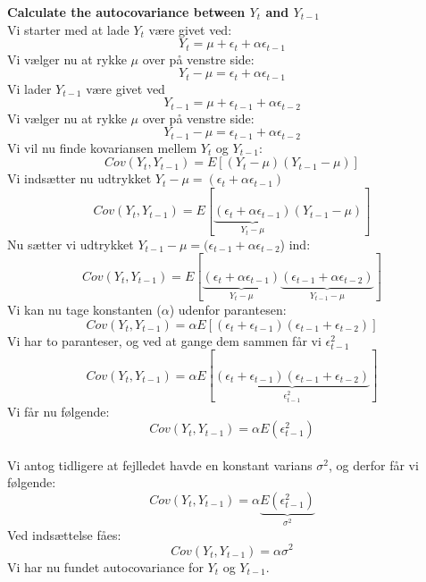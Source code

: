 \documentclass[
  10pt,
]{article}
\begin{document}
\textbf{Calculate the autocovariance between $Y_t$ and $Y_{t-1}$}\\
Vi starter med at lade \(Y_t\) være givet ved:\\
\[Y_t = \mu + \epsilon_t + \alpha \epsilon_{t-1} \] Vi vælger nu at
rykke \(\mu\) over på venstre side:\\
\[Y_t - \mu = \epsilon_t + \alpha \epsilon_{t-1} \] Vi lader \(Y_{t-1}\)
være givet ved\\
\[Y_{t-1} = \mu + \epsilon_{t-1} + \alpha \epsilon_{t-2} \] Vi vælger nu
at rykke \(\mu\) over på venstre side:\\
\[Y_{t-1} - \mu = \epsilon_{t-1} + \alpha \epsilon_{t-2} \] Vi vil nu
finde kovariansen mellem \(Y_t\) og \(Y_{t-1}\):\\
\[Cov(Y_t,Y_{t-1}) = E[(Y_t-\mu)(Y_{t-1}-\mu)] \] Vi indsætter nu
udtrykket \(Y_t - \mu = (\epsilon_t + \alpha \epsilon_{t-1})\)\\
\[Cov(Y_t,Y_{t-1}) = E[\underbrace{(\epsilon_t + \alpha \epsilon_{t-1})}_\text{$Y_t - \mu$}(Y_{t-1}-\mu)] \]
Nu sætter vi udtrykket
\(Y_{t-1} - \mu = (\epsilon_{t-1} + \alpha \epsilon_{t-2}\)) ind:\\
\[Cov(Y_t,Y_{t-1}) = E[\underbrace{(\epsilon_t + \alpha \epsilon_{t-1})}_\text{$Y_t - \mu$}\underbrace{(\epsilon_{t-1} + \alpha \epsilon_{t-2})}_\text{$Y_{t-1} - \mu$}] \]
Vi kan nu tage konstanten (\(\alpha\)) udenfor parantesen:\\
\[Cov(Y_t,Y_{t-1}) = \alpha E[(\epsilon_t + \epsilon_{t-1})(\epsilon_{t-1} + \epsilon_{t-2})] \]
Vi har to paranteser, og ved at gange dem sammen får vi
\(\epsilon_{t-1}^2\)\\
\[Cov(Y_t,Y_{t-1}) = \alpha E[\underbrace{(\epsilon_t + \epsilon_{t-1})(\epsilon_{t-1} + \epsilon_{t-2})}_\text{$\epsilon_{t-1}^2$}] \]
Vi får nu følgende:\\
\[Cov(Y_t,Y_{t-1}) = \alpha E(\epsilon_{t-1}^2) \]\\
Vi antog tidligere at fejlledet havde en konstant varians \(\sigma^2\),
og derfor får vi følgende:\\
\[Cov(Y_t,Y_{t-1}) = \alpha \underbrace{E(\epsilon_{t-1}^2)}_\text{$\sigma^2$}\]
Ved indsættelse fåes:\\
\[Cov(Y_t,Y_{t-1}) = \alpha \sigma^2\] Vi har nu fundet autocovariance
for \(Y_t\) og \(Y_{t-1}\).\\

\newpage
\end{document}
